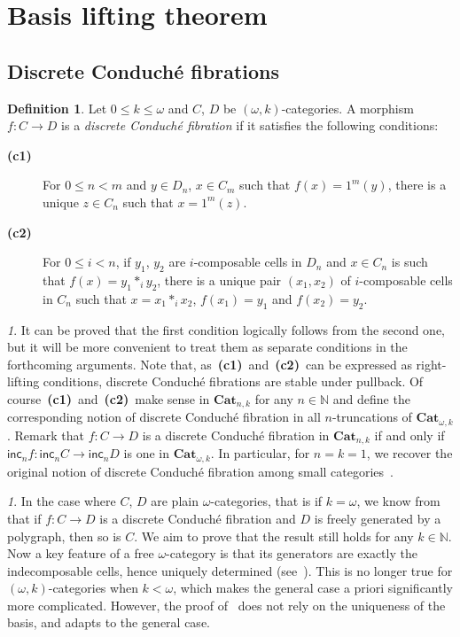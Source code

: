 \documentclass[reqno]{amsart}
\theoremstyle{plain}
\theoremstyle{definition}
\newtheorem{definition}[subsubsection]{Definition}
\theoremstyle{remark}
\newtheorem{paragr}[subsubsection]{} %
\newcommand{\nmbr}[1]{\mathbb #1}
\newcommand{\N}{\nmbr{N}}
\newcommand{\pair}[2]{(#1,#2)}       %
\newcommand{\unit}[1]{1^{#1}} %
\newcommand{\ctg}[1]{\mathbf{#1}}  %
\newcommand{\Cat}{\ctg{Cat}}   %
\newcommand{\npCat}[2]{\Cat_{#1,#2}}  %
\newcommand{\opCat}[1]{\Cat_{\omega,#1}} %
\newcommand{\functor}[1]{\mathsf{#1}} %
\newcommand{\inc}[2]{\functor{inc}_{#1}^{#2}}%
\newcommand{\oinc}[1]{\inc{#1}{}}%
\newcommand{\comp}[1]{\ast_{#1}} %
\newcommand{\oo}{\ensuremath{\omega}}
\newcommand{\ook}[1]{\ensuremath{\pair{\omega}{#1}}}
\newcommand{\cndi}{\textbf{(c1)}} %
\newcommand{\cndii}{\textbf{(c2)}} %
\begin{document}
   \section{Basis lifting theorem}\label{sec:basislift}

\subsection{Discrete Conduché fibrations}\label{subsec:conduche}
\begin{definition}\label{def:conduche}
   Let $0 \leq k\leq \oo$ and $C$, $D$ be \ook k-categories. A morphism $f:C\to D$ is a {\em discrete Conduché fibration} if it satisfies the following conditions:
  \begin{description}
  \item[\cndi] For $0\leq n<m$ and  $y\in D_n$,  $x\in C_m$ such that $f(x)=\unit
    m(y)$, there is a unique $z\in C_n$ such that $x=\unit m(z)$.
    \item[\cndii] For $0\leq i<n$, if $y_1$, $y_2$ are $i$-composable cells in
      $D_n$ and $x\in C_n$ is such that $f(x)=y_1\comp i y_2$, there is a unique pair $\pair{x_1}{x_2}$ of $i$-composable cells in $C_n$ such that $x=x_1\comp i x_2$, $f(x_1)=y_1$ and $f(x_2)=y_2$.
    \end{description}
  \end{definition}
 \begin{paragr}\label{paragr:properties_conduche}
 It can be proved that the first condition logically
    follows from the second one, but it will be more convenient to treat
    them as separate conditions in the forthcoming arguments. Note that, as~\cndi\ 
    and~\cndii\ can be expressed as right-lifting conditions, 
    discrete Conduché fibrations are stable under pullback. Of
    course~\cndi\ and~\cndii\ make sense in $\npCat nk$ for any
    $n\in\N$ and define the corresponding notion of discrete Conduché
    fibration in all $n$-truncations of $\opCat k$. 
    Remark that $f:C\to D$
    is a discrete Conduché fibration in $\npCat nk$ if and only if
    $\oinc n f:\oinc n C\to\oinc n D$ is one in $\opCat k$. In
    particular, for $n=k=1$, we recover the original notion of
    discrete Conduché fibration among small
    categories~\cite{conduche:exisad}.  
  \end{paragr}
  \begin{paragr} \label{paragr:lift_conduche}
In the case where $C$, $D$ are plain \oo-categories, that is if
$k=\omega$, we know from~\cite[Theorem 6.11]{guetta:poldcf} that if
$f:C\to D$ is a discrete Conduché fibration and $D$ is freely
generated by a polygraph, then so is $C$. We aim to prove that the
result still holds for any $k\in\N$. Now a key feature of a free \oo-category is that its generators are
     exactly the indecomposable cells, hence uniquely determined
     (see~\cite[Section 4, Proposition 8.3]{makkai:worcom}). This is
     no longer true for \ook k-categories when $k<\omega$, which makes the general case a
     priori significantly more complicated. However, the proof
     of~\cite[Theorem 6.11]{guetta:poldcf} does not rely on the
     uniqueness of the basis, and adapts to the general case.
  \end{paragr}
  
\end{document}
